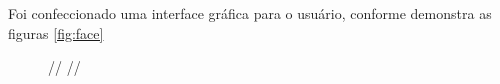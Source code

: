 \par Foi confeccionado uma interface gráfica para o usuário, conforme demonstra as figuras \ref{fig:face}

\begin{figure}[H]
  \centering
  //
  //

\end{figure}
